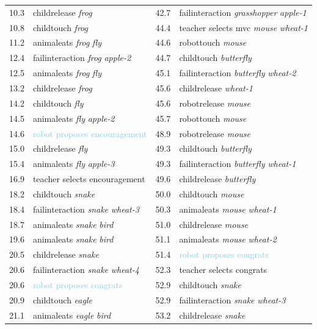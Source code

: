 {\begin{table}[ht]
\begin{tabularx}{\textwidth}{@{}L{.2}L{1.7}|L{.2}L{1.9}@{}}
10.3 & childrelease \emph{frog} & 42.7 & failinteraction \emph{grasshopper} \emph{apple-1}\\
10.8 & childtouch \emph{frog} & 44.4 & \textcolor{BurntOrange}{teacher selects mvc \emph{mouse} \emph{wheat-1}}\\
11.2 & animaleats \emph{frog} \emph{fly} & 44.6 & robottouch \emph{mouse}\\
12.4 & failinteraction \emph{frog} \emph{apple-2} & 44.7 & childtouch \emph{butterfly}\\
12.5 & animaleats \emph{frog} \emph{fly} & 45.1 & failinteraction \emph{butterfly} \emph{wheat-2}\\
13.2 & childrelease \emph{frog} & 45.6 & childrelease \emph{wheat-1}\\
14.2 & childtouch \emph{fly} & 45.6 & robotrelease \emph{mouse}\\
14.5 & animaleats \emph{fly} \emph{apple-2} & 45.7 & robottouch \emph{mouse}\\
14.6 & \textcolor{SkyBlue}{robot proposes encouragement} & 48.9 & robotrelease \emph{mouse}\\
15.0 & childrelease \emph{fly} & 49.3 & childtouch \emph{butterfly}\\
15.4 & animaleats \emph{fly} \emph{apple-3} & 49.3 & failinteraction \emph{butterfly} \emph{wheat-1}\\
16.9 & \textcolor{BurntOrange}{teacher selects encouragement} & 49.6 & childrelease \emph{butterfly}\\
18.2 & childtouch \emph{snake} & 50.0 & childtouch \emph{mouse}\\
18.4 & failinteraction \emph{snake} \emph{wheat-3} & 50.3 & animaleats \emph{mouse} \emph{wheat-1}\\
18.7 & animaleats \emph{snake} \emph{bird} & 51.0 & childrelease \emph{mouse}\\
19.6 & animaleats \emph{snake} \emph{bird} & 51.1 & animaleats \emph{mouse} \emph{wheat-2}\\
20.5 & childrelease \emph{snake} & 51.4 & \textcolor{SkyBlue}{robot proposes congrats}\\
20.6 & failinteraction \emph{snake} \emph{wheat-4} & 52.3 & \textcolor{BurntOrange}{teacher selects congrats}\\
20.6 & \textcolor{SkyBlue}{robot proposes congrats} & 52.9 & childtouch \emph{snake}\\
20.9 & childtouch \emph{eagle} & 52.9 & failinteraction \emph{snake} \emph{wheat-3}\\
21.1 & animaleats \emph{eagle} \emph{bird} & 53.2 & childrelease \emph{snake}\\

\end{tabularx}
\end{table}}

